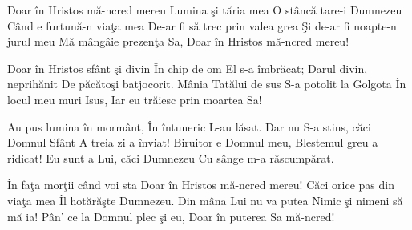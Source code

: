 
\beginverse
Doar în Hristos mă-ncred mereu
Lumina şi tăria mea
O stâncă tare-i Dumnezeu
Când e furtună-n viaţa mea
De-ar fi să trec prin valea grea
Şi de-ar fi noapte-n jurul meu
Mă mângâie prezenţa Sa,
Doar în Hristos mă-ncred mereu!
\endverse

\beginverse
Doar în Hristos sfânt şi divin
În chip de om El s-a îmbrăcat;
Darul divin, neprihănit
De păcătoşi batjocorit.
Mânia Tatălui de sus
S-a potolit la Golgota
În locul meu muri Isus,
Iar eu trăiesc prin moartea Sa!
\endverse

\beginverse
Au pus lumina în mormânt,
În întuneric L-au lăsat.
Dar nu S-a stins, căci Domnul Sfânt
A treia zi a înviat!
Biruitor e Domnul meu,
Blestemul greu a ridicat!
Eu sunt a Lui, căci Dumnezeu
Cu sânge m-a răscumpărat.
\endverse

\beginverse
În faţa morţii când voi sta
Doar în Hristos mă-ncred mereu!
Căci orice pas din viaţa mea
Îl hotărăşte Dumnezeu.
Din mâna Lui nu va putea
Nimic şi nimeni să mă ia!
Pân' ce la Domnul plec şi eu,
Doar în puterea Sa mă-ncred!
\endverse

\endsong